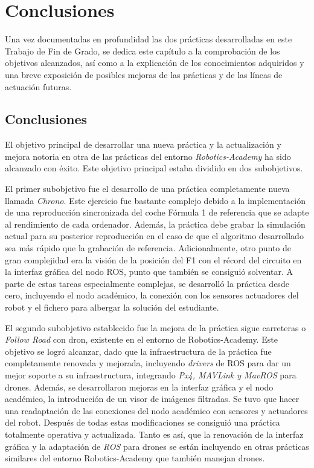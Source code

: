 \chapter{Conclusiones}\label{cap.conclusiones}
Una vez documentadas en profundidad las dos prácticas desarrolladas en este Trabajo de Fin de Grado, se dedica este capítulo a la comprobación de los objetivos alcanzados, así como a la explicación de los conocimientos adquiridos y una breve exposición de posibles mejoras de las prácticas y de las líneas de actuación futuras.

\section{Conclusiones}
El objetivo principal de desarrollar una nueva práctica y la actualización y mejora notoria en otra de las prácticas del entorno \textit{Robotics-Academy} ha sido alcanzado con éxito. Este objetivo principal estaba dividido en dos subobjetivos.

El primer subobjetivo fue el desarrollo de una práctica completamente nueva llamada \textit{Chrono}. Este ejercicio fue bastante complejo debido a la implementación de una reproducción sincronizada del coche Fórmula 1 de referencia que se adapte al rendimiento de cada ordenador. Además, la práctica debe grabar la simulación actual para su posterior reproducción en el caso de que el algoritmo desarrollado sea más rápido que la grabación de referencia. Adicionalmente, otro punto de gran complejidad era la visión de la posición del F1 con el récord del circuito en la interfaz gráfica del nodo ROS, punto que también se consiguió solventar. A parte de estas tareas especialmente complejas, se desarrolló la práctica desde cero, incluyendo el nodo académico, la conexión con los sensores actuadores del robot y el fichero para albergar la solución del estudiante.

El segundo subobjetivo establecido fue la mejora de la práctica sigue carreteras o \textit{Follow Road} con dron, existente en el entorno de Robotics-Academy. Este objetivo se logró alcanzar, dado que la infraestructura de la práctica fue completamente renovada y mejorada, incluyendo \textit{drivers} de ROS para dar un mejor soporte a su infraestructura, integrando \textit{Px4, MAVLink y MavROS} para drones. Además, se desarrollaron mejoras en la interfaz gráfica y el nodo académico, la introducción de un visor de imágenes filtradas. Se tuvo que hacer una readaptación de las conexiones del nodo académico con sensores y actuadores del robot. Después de todas estas modificaciones se consiguió una práctica totalmente operativa y actualizada. Tanto es así, que la renovación de la interfaz gráfica y la adaptación de \textit{ROS} para drones se están incluyendo en otras prácticas similares del entorno Robotics-Academy que también manejan drones.


